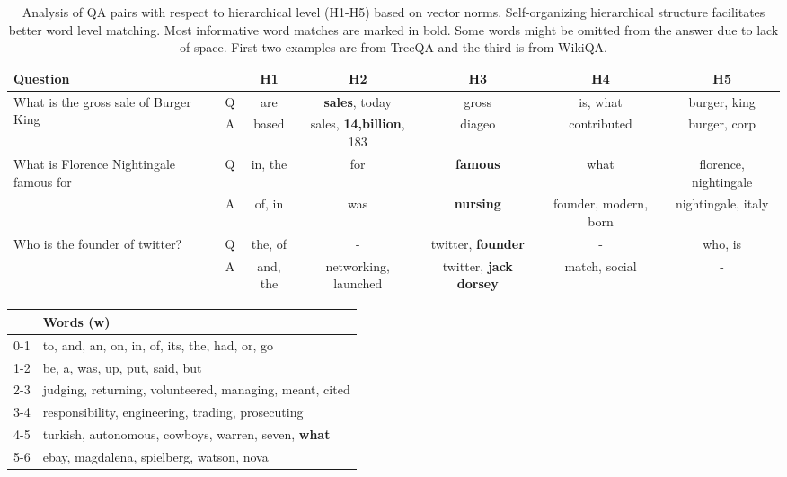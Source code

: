 \documentclass[sigconf]{acmart}
\begin{document}
\begin{table*}[htbp]
  \centering
  \small
  
    \begin{tabular}{l|c|c|c|c|c|c}
    \hline
         Question &       & H1     & H2 & H3 & H4 & H5 \\
          \hline
    \multirow{2}[0]{*}{What is the gross sale of Burger King} & Q & are   & \textbf{sales}, today & gross & is, what & burger, king  \\
          & A& based & sales, \textbf{14,billion}, 183 & diageo & contributed & burger, corp  \\
          \hline
    \multirow{2}[0]{*}{What is Florence Nightingale famous for} & Q & in, the & for   & \textbf{famous} & what  & florence, nightingale \\
          & A & of, in & was   & \textbf{nursing} & founder, modern, born & nightingale, italy   \\
          \hline
    \multirow{2}[0]{*}{Who is the founder of twitter?} & Q & the, of & -     & twitter, \textbf{founder} & - & who, is  \\
          & A & and, the & networking, launched & twitter, \textbf{jack dorsey}& match, social & -       \\
          \hline
    
    \end{tabular}\caption{Analysis of QA pairs with respect to hierarchical level (H1-H5) based on vector norms. Self-organizing hierarchical structure facilitates better word level matching. Most informative word matches are marked in bold. Some words might be omitted from the answer due to lack of space. First two examples are from TrecQA and the third is from WikiQA. }
  \label{tab:big_table}\end{table*}\begin{table}[htbp]

  \centering
  \small
    \begin{tabular}{ll}
    \hline
      & Words (w) \\
    \hline
    0-1   & to, and, an, on, in, of, its, the, had, or, go \\
    1-2      & be, a, was, up, put, said, but  \\
      2-3    & judging, returning, volunteered, managing, meant, cited \\
      3-4    &  responsibility, engineering, trading, prosecuting\\
      4-5    & turkish, autonomous, cowboys, warren, seven, \textbf{what} \\
       5-6   & ebay, magdalena, spielberg, watson, nova  \\
       \hline
    \end{tabular}






\end{table}
\end{document}
